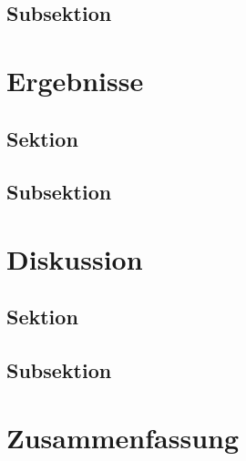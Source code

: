 \documentclass{scrreprt}
\begin{document}
\section{Subsektion}


\chapter{Ergebnisse}

\section{Sektion}
\section{Subsektion}

	
\chapter{Diskussion}

\section{Sektion}
\section{Subsektion}


\chapter{Zusammenfassung}


\end{document}
